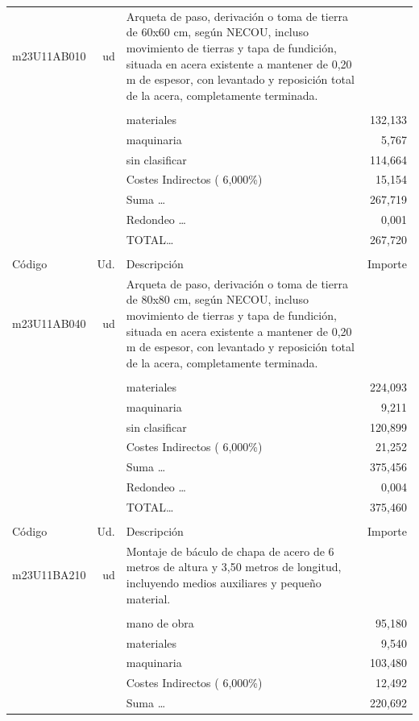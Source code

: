 \documentclass{book}%
\begin{document}
\begin{supertabular}{l r p{60mm} r}
\hline%
m23U11AB010&ud&Arqueta de paso, derivación o toma de tierra de 60x60 cm, según NECOU, incluso movimiento de tierras y tapa de fundición, situada en acera existente a mantener de 0,20 m de espesor, con levantado y reposición total de la acera, completamente terminada.&\\%
&&&\\%
&&materiales&   132,133\\%
&&maquinaria&     5,767\\%
&&sin clasificar&   114,664\\%
&&Costes Indirectos (     6,000\%)&    15,154\\%
&&Suma \ldots&   267,719\\%
&&Redondeo \ldots&     0,001\\%
%
&&TOTAL\ldots&   267,720\\%
&&&\\%
Código&Ud.&Descripción&Importe\\%
\hline%
m23U11AB040&ud&Arqueta de paso, derivación o toma de tierra de 80x80 cm, según NECOU, incluso movimiento de tierras y tapa de fundición, situada en acera existente a mantener de 0,20 m de espesor, con levantado y reposición total de la acera, completamente terminada.&\\%
&&&\\%
&&materiales&   224,093\\%
&&maquinaria&     9,211\\%
&&sin clasificar&   120,899\\%
&&Costes Indirectos (     6,000\%)&    21,252\\%
&&Suma \ldots&   375,456\\%
&&Redondeo \ldots&     0,004\\%
%
&&TOTAL\ldots&   375,460\\%
&&&\\%
Código&Ud.&Descripción&Importe\\%
\hline%
m23U11BA210&ud&Montaje de báculo de chapa de acero de 6 metros de altura y 3,50 metros de longitud, incluyendo medios auxiliares y pequeño material.&\\%
&&&\\%
&&mano de obra&    95,180\\%
&&materiales&     9,540\\%
&&maquinaria&   103,480\\%
&&Costes Indirectos (     6,000\%)&    12,492\\%
&&Suma \ldots&   220,692\\%

\end{supertabular}
\end{document}
